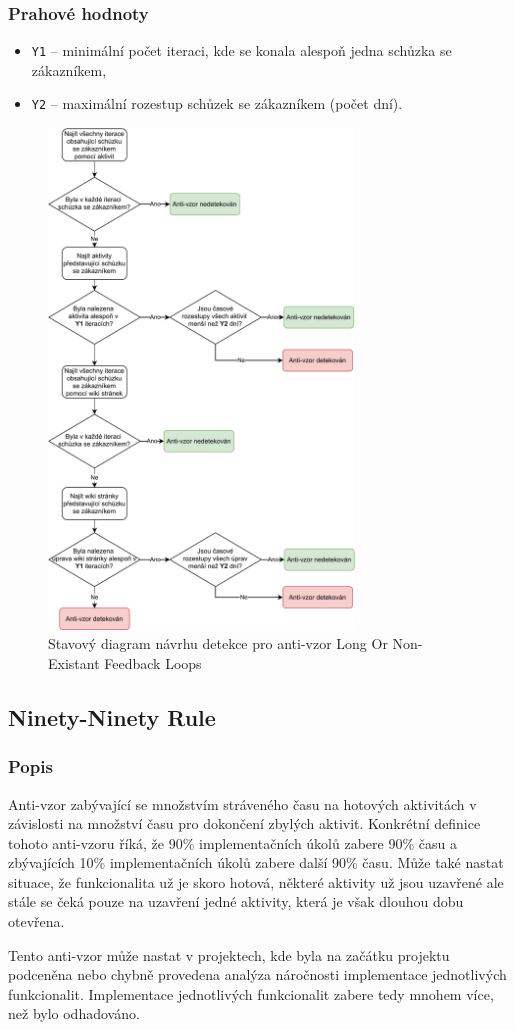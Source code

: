 \documentclass[czech,DP]{thesiskiv}
\begin{document}
\subsubsection{Prahové hodnoty}
\begin{itemize}
    \item \texttt{Y1} -- minimální počet iteraci, kde se konala alespoň jedna schůzka se zákazníkem,
    \item \texttt{Y2} -- maximální rozestup schůzek se zákazníkem (počet dní).
\end{itemize}
\begin{figure}[!htb]
    \centering
    \includegraphics[width=230pt]{img/long_or_non_existent_feedback_loops.pdf}
    \caption{Stavový diagram návrhu detekce pro anti-vzor Long Or Non-Existant Feedback Loops}
    \label{img:long_or_non_existent_feedback_loops}
\end{figure}
\FloatBarrier
\subsection{Ninety-Ninety Rule}
\subsubsection{Popis}
Anti-vzor zabývající se množstvím stráveného času na hotových aktivitách v závislosti na množství času pro dokončení zbylých aktivit. Konkrétní definice tohoto anti-vzoru říká, že 90\% implementačních úkolů zabere 90\% času a zbývajících 10\% implementačních úkolů zabere další 90\% času. Může také nastat situace, že funkcionalita už je skoro hotová, některé aktivity už jsou uzavřené ale stále se čeká pouze na uzavření jedné aktivity, která je však dlouhou dobu otevřena.\cite{ninety_ninety}
\par
Tento anti-vzor může nastat v projektech, kde byla na začátku projektu podceněna nebo chybně provedena analýza náročnosti implementace jednotlivých funkcionalit. Implementace jednotlivých funkcionalit zabere tedy mnohem více, než bylo odhadováno.
\end{document}
